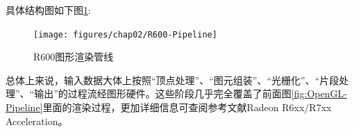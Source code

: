 具体结构图如下图\ref{fig:R600-Pipeline}:

\begin{figure}[H] 
  \centering
  \texttt{[image: figures/chap02/R600-Pipeline]}
  \caption{R600图形渲染管线}
  \label{fig:R600-Pipeline}
\end{figure}

总体上来说，输入数据大体上按照“顶点处理”、“图元组装”、“光栅化”、“片段处理”、“输出”的过程流经图形硬件。这些阶段几乎完全覆盖了前面图\ref{fig:OpenGL-Pipeline}里面的渲染过程，更加详细信息可查阅参考文献Radeon R6xx/R7xx Acceleration\cite{Radeon-Manual}。
